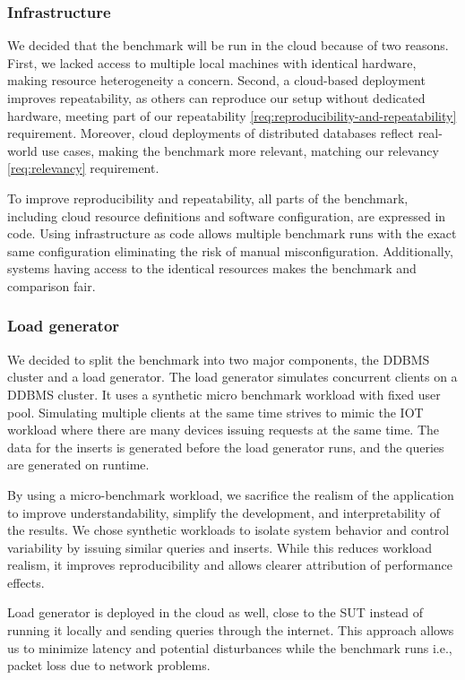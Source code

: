 \subsubsection{Infrastructure}
We decided that the benchmark will be run in the cloud because of two reasons.
First, we lacked access to multiple local machines with identical hardware, making resource heterogeneity a concern.
Second, a cloud-based deployment improves repeatability, as others can reproduce our setup without dedicated hardware, meeting part of our repeatability \ref{req:reproducibility-and-repeatability} requirement.
Moreover, cloud deployments of distributed databases reflect real-world use cases, making the benchmark more relevant, matching our relevancy \ref{req:relevancy} requirement.

To improve reproducibility and repeatability, all parts of the benchmark, including cloud resource definitions and software configuration, are expressed in code.
Using infrastructure as code allows multiple benchmark runs with the exact same configuration eliminating the risk of manual misconfiguration.
Additionally, systems having access to the identical resources makes the benchmark and comparison fair.

\subsubsection{Load generator}
We decided to split the benchmark into two major components, the DDBMS cluster and a load generator.
The load generator simulates concurrent clients on a DDBMS cluster.
It uses a  synthetic micro benchmark workload with fixed user pool.
Simulating multiple clients at the same time strives to mimic the IOT workload where there are many devices issuing requests at the same time.
The data for the inserts is generated before the load generator runs, and the queries are generated on runtime.

By using a micro-benchmark workload, we sacrifice the realism of the application to improve understandability, simplify the development, and interpretability of the results.
We chose synthetic workloads to isolate system behavior and control variability by issuing similar queries and inserts.
While this reduces workload realism, it improves reproducibility and allows clearer attribution of performance effects.

Load generator is deployed in the cloud as well, close to the SUT instead of running it locally and sending queries through the internet.
This approach allows us to minimize latency and potential disturbances while the benchmark runs i.e., packet loss due to network problems.

